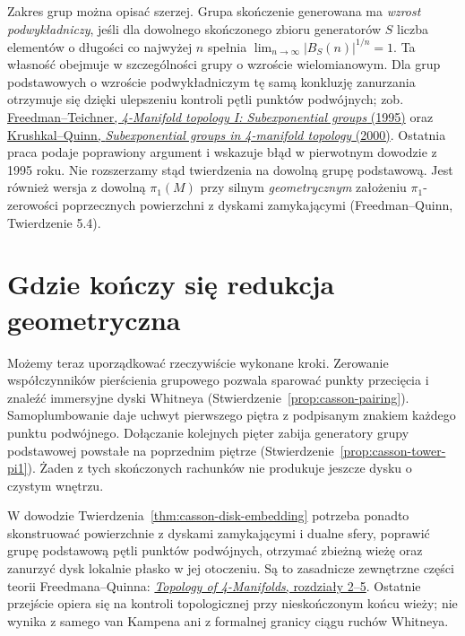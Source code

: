 Zakres grup można opisać szerzej. Grupa skończenie
generowana ma \emph{wzrost podwykładniczy}, jeśli
dla dowolnego skończonego zbioru generatorów $S$
liczba elementów o długości co najwyżej $n$
spełnia $\lim_{n\to\infty}|B_S(n)|^{1/n}=1$.
Ta własność obejmuje w szczególności grupy
o wzroście wielomianowym. Dla grup podstawowych
o wzroście podwykładniczym tę samą konkluzję
zanurzania otrzymuje się dzięki ulepszeniu
kontroli pętli punktów podwójnych; zob.
\href{https://math.berkeley.edu/~teichner/Papers/Freedman1.pdf}
{Freedman--Teichner, \emph{4-Manifold topology I:
Subexponential groups} (1995)} oraz
\href{https://uva.theopenscholar.com/files/slava-krushkal/files/subexponential_groups.pdf}
{Krushkal--Quinn, \emph{Subexponential groups in
4-manifold topology} (2000)}. Ostatnia praca
podaje poprawiony argument i wskazuje błąd
w pierwotnym dowodzie z 1995 roku. Nie
rozszerzamy stąd twierdzenia na dowolną grupę
podstawową. Jest również wersja z dowolną
$\pi_1(M)$ przy silnym \emph{geometrycznym}
założeniu $\pi_1$-zerowości poprzecznych
powierzchni z dyskami zamykającymi
(Freedman--Quinn, Twierdzenie 5.4).

\section{Gdzie kończy się redukcja geometryczna}
\label{sec:casson-boundary}

Możemy teraz uporządkować rzeczywiście wykonane
kroki. Zerowanie współczynników pierścienia
grupowego pozwala sparować punkty przecięcia
i znaleźć immersyjne dyski Whitneya
(Stwierdzenie~\ref{prop:casson-pairing}).
Samoplumbowanie daje uchwyt pierwszego
piętra z podpisanym znakiem każdego punktu
podwójnego. Dołączanie kolejnych pięter zabija
generatory grupy podstawowej powstałe na
poprzednim piętrze
(Stwierdzenie~\ref{prop:casson-tower-pi1}).
Żaden z tych skończonych rachunków nie produkuje
jeszcze dysku o czystym wnętrzu.

W dowodzie Twierdzenia~\ref{thm:casson-disk-embedding}
potrzeba ponadto skonstruować powierzchnie z
dyskami zamykającymi i dualne sfery, poprawić
grupę podstawową pętli punktów podwójnych,
otrzymać zbieżną wieżę oraz zanurzyć dysk
lokalnie płasko w jej otoczeniu. Są to zasadnicze
zewnętrzne części teorii Freedmana--Quinna:
\href{https://archive.mpim-bonn.mpg.de/4789/2/FreedmanQuinn-TopologyOf4Manifolds-Reformatted2013.pdf}
{\emph{Topology of 4-Manifolds}, rozdziały 2--5}.
Ostatnie przejście opiera się na kontroli
topologicznej przy nieskończonym końcu wieży;
nie wynika z samego van Kampena ani z formalnej
granicy ciągu ruchów Whitneya.

